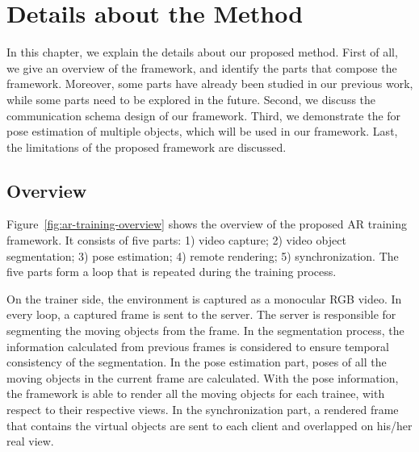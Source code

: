 \chapter{Details about the Method}
\label{chap:dm}

In this chapter, we explain the details about our proposed method.
First of all, we give an overview of the framework, and identify the parts that compose the framework. Moreover, some parts have already been studied in our previous work, while some parts need to be explored in the future.
Second, we discuss the communication schema design of our framework.
Third, we demonstrate the for pose estimation of multiple objects, which will be used in our framework.
Last, the limitations of the proposed framework are discussed.

\section{Overview}
\label{sec:dm:ov}

Figure~\ref{fig:ar-training-overview} shows the overview of the proposed AR training framework. It consists of five parts: 1) video capture; 2) video object segmentation; 3) pose estimation; 4) remote rendering; 5) synchronization.
The five parts form a loop that is repeated during the training process.

On the trainer side, the environment is captured as a monocular RGB video. In every loop, a captured frame is sent to the server.
The server is responsible for segmenting the moving objects from the frame. In the segmentation process, the information calculated from previous frames is considered to ensure temporal consistency of the segmentation.
In the pose estimation part, poses of all the moving objects in the current frame are calculated.
With the pose information, the framework is able to render all the moving objects for each trainee, with respect to their respective views.
In the synchronization part, a rendered frame that contains the virtual objects are sent to each client and overlapped on his/her real view.

